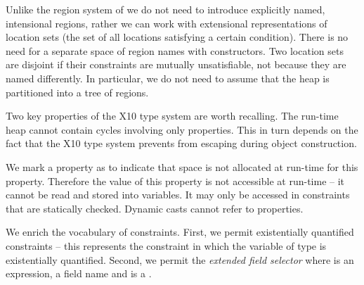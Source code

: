 Unlike the region system of \cite{DPJ} we do not need to introduce
explicitly named, intensional regions, rather we can work with
extensional representations of location sets (the set of all locations
satisfying a certain condition).  There is no need for a separate
space of region names with constructors. Two location sets are
disjoint if their constraints are mutually unsatisfiable, not because
they are named differently. In particular, we do not need to assume
that the heap is partitioned into a tree of regions.

Two key properties of the X10 type system are worth recalling. The run-time
heap cannot contain cycles involving only properties. This in turn
depends on the fact that the X10 type system prevents  from
escaping during object construction\cite{X10-object-initialization}.

We mark a property as  to indicate that space is not
allocated at run-time for this property. Therefore the value of this
property is not accessible at run-time -- it cannot be read and stored
into variables. It may only be accessed in constraints that are
statically checked. Dynamic casts cannot refer to 
properties.

We enrich the vocabulary of constraints. First, we permit
existentially quantified constraints  -- this represents
the constraint  in which the variable  of type
 is existentially quantified. Second, we permit the {\em
  extended field selector}  where  is an
expression,  a field name and  is a . 







